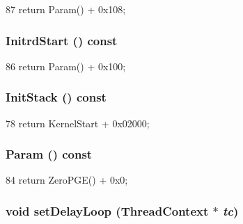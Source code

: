 \begin{DoxyCode}
87 { return Param() + 0x108; }
\end{DoxyCode}
\hypertarget{classLinuxMipsSystem_abca06263004752bd3ae5595b19a0c288}{
\subsubsection[{InitrdStart}]{ InitrdStart () const}}
\label{classLinuxMipsSystem_abca06263004752bd3ae5595b19a0c288}



\begin{DoxyCode}
86 { return Param() + 0x100; }
\end{DoxyCode}
\hypertarget{classLinuxMipsSystem_a469a89bdc63563c0bc5846ef647dcab6}{
\subsubsection[{InitStack}]{ InitStack () const}}
\label{classLinuxMipsSystem_a469a89bdc63563c0bc5846ef647dcab6}



\begin{DoxyCode}
78 { return KernelStart + 0x02000; }
\end{DoxyCode}
\hypertarget{classLinuxMipsSystem_a0df930196034a157336cf5c0b8c62619}{
\subsubsection[{Param}]{ Param () const}}
\label{classLinuxMipsSystem_a0df930196034a157336cf5c0b8c62619}



\begin{DoxyCode}
84 { return ZeroPGE() + 0x0; }
\end{DoxyCode}
\hypertarget{classLinuxMipsSystem_a137cc9484ecf0bcc374fb7031b48d566}{
\subsubsection[{setDelayLoop}]{\setlength{\rightskip}{0pt plus 5cm}void setDelayLoop ({\bf ThreadContext} $\ast$ {\em tc})}}
\label{classLinuxMipsSystem_a137cc9484ecf0bcc374fb7031b48d566}



